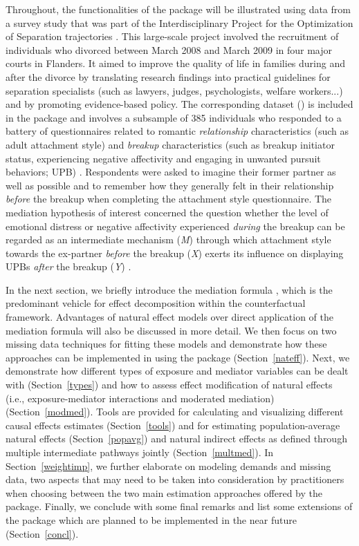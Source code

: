 \documentclass[nojss]{jss}
\begin{document}
\par Throughout, the functionalities of the  package will be illustrated using data from a survey study that was part of the Interdisciplinary Project for the Optimization of Separation trajectories . This large-scale project involved the recruitment of individuals who divorced between March 2008 and March 2009 in four major courts in Flanders. It aimed to improve the quality of life in families during and after the divorce by translating research findings into practical guidelines for separation specialists (such as lawyers, judges, psychologists, welfare workers...) and by promoting evidence-based policy. The corresponding dataset () is included in the package and involves a subsample of 385 individuals who responded to a battery of questionnaires related to romantic \textit{relationship} characteristics (such as adult attachment style) and \textit{breakup} characteristics (such as breakup initiator status, experiencing negative affectivity and engaging in unwanted pursuit behaviors; UPB) \citep{Smet2012}. Respondents were asked to imagine their former partner as well as possible and to remember how they generally felt in their relationship \textit{before} the breakup when completing the attachment style questionnaire. The mediation hypothesis of interest concerned the question whether the level of emotional distress or negative affectivity experienced \textit{during} the breakup can be regarded as an intermediate mechanism (\textit{M}) through which attachment style towards the ex-partner \textit{before} the breakup (\textit{X}) exerts its influence on displaying UPBs \textit{after} the breakup (\textit{Y}) \citep{Loeys2013a}.
\par In the next section, we briefly introduce the mediation formula \citep{Pearl2001,Pearl2012,Petersen2006,Imai2010a}, which is the predominant vehicle for effect decomposition within the counterfactual framework. Advantages of natural effect models over direct application of the mediation formula will also be discussed in more detail. We then focus on two missing data techniques for fitting these models and demonstrate how these approaches can be implemented in  using the  package (Section~\ref{nateff}). Next, we demonstrate how different types of exposure and mediator variables can be dealt with (Section~\ref{types}) and how to assess effect modification of natural effects (i.e., exposure-mediator interactions and moderated mediation) (Section~\ref{modmed}). Tools are provided for calculating and visualizing different causal effects estimates (Section~\ref{tools}) and for estimating population-average natural effects (Section~\ref{popavg}) and natural indirect effects as defined through multiple intermediate pathways jointly (Section~\ref{multmed}). In Section~\ref{weightimp}, we further elaborate on modeling demands and missing data, two aspects that may need
to be taken into consideration by practitioners when choosing between the two main estimation approaches offered by the package. Finally, we conclude with some final remarks and list some extensions of the package which are planned to be implemented in the near future (Section~\ref{concl}).
\end{document}
